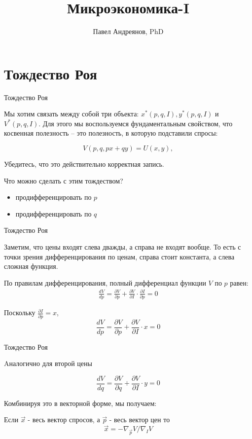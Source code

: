 \documentclass{beamer}
\title{
Микроэкономика-I
}
\author{
Павел Андреянов, PhD
}
\begin{document}
\maketitle

\section{Тождество Роя}

\begin{frame}{Тождество Роя}

Мы хотим связать между собой три объекта: $x^{\ast}(p,q,I), y^{\ast}(p,q,I)$ и  $V^{\ast}(p,q,I)$. Для этого мы воспользуемся фундаментальным свойством, что косвенная полезность – это полезность, в которую подставили спросы:

$$V(p, q, px + qy) = U(x, y),$$

Убедитесь, что это действительно корректная запись.

Что можно сделать с этим тождеством?
\begin{itemize}
\item продифференцировать по $p$
\item продифференцировать по $q$
\end{itemize}

\end{frame}


\begin{frame}{Тождество Роя}

Заметим, что цены входят слева дважды, а справа не входят вообще. То есть с точки зрения дифференцирования по ценам, справа стоит константа, а слева сложная функция. 

По правилам дифференцирования, полный дифференциал функции $V$ по $p$ равен:
\begin{gather*}
\frac{d V}{d p} = \frac{\partial V}{\partial p} + \frac{\partial V}{\partial I} \cdot \frac{\partial I}{\partial p} = 0
\end{gather*}

Поскольку $\frac{\partial I}{\partial p} = x$, 
$$\frac{d V}{d p} = \frac{\partial V}{\partial p} + \frac{\partial V}{\partial I} \cdot x = 0$$

\end{frame}

\begin{frame}{Тождество Роя}

Aналогично для второй цены

$$\frac{d V}{d q} = \frac{\partial V}{\partial q} + \frac{\partial V}{\partial I} \cdot y = 0$$

Комбинируя это в векторной форме, мы получаем:

\begin{theorem}
Если $\vec{x}$ - весь вектор спросов, а $\vec{p}$ - весь вектор цен то
$$\vec{x} = - \nabla_{\vec{p}} V / \nabla_I V$$
\end{theorem}

\end{frame}
\end{document}
